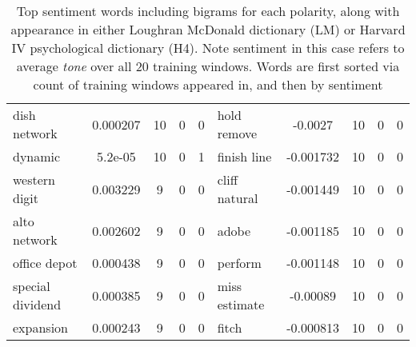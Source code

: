 \documentclass[ oneside,%
                    author={Joshua Felmeden},
                    degree={MEng},
                     title={Sentiment Analysis of Financial Headlines Based on Realised Stock Returns},
                  subtitle={Research}]{dissertation}
\begin{document}
\begin{table}[!ht]
\begin{tabular}{lcccclcccc}
dish network & 0.000207 & 10 & 0 & 0 & hold remove & -0.0027 & 10 & 0 & 0 \\
dynamic & 5.2e-05 & 10 & 0 & 1 & finish line & -0.001732 & 10 & 0 & 0 \\
western digit & 0.003229 & 9 & 0 & 0 & cliff natural & -0.001449 & 10 & 0 & 0 \\
alto network & 0.002602 & 9 & 0 & 0 & adobe & -0.001185 & 10 & 0 & 0 \\
office depot & 0.000438 & 9 & 0 & 0 & perform & -0.001148 & 10 & 0 & 0 \\
special dividend & 0.000385 & 9 & 0 & 0 & miss estimate & -0.00089 & 10 & 0 & 0 \\
expansion & 0.000243 & 9 & 0 & 0 & fitch & -0.000813 & 10 & 0 & 0 \\
\bottomrule
\end{tabular}
\caption[Sentiment word list for bigrams]{Top sentiment words including bigrams for each polarity, along with appearance in either Loughran McDonald dictionary (LM) or Harvard IV psychological dictionary (H4). Note sentiment in this case refers to average \textit{tone} over all 20 training windows. Words are first sorted via count of training windows appeared in, and then by sentiment}
\end{table}
\end{document}
